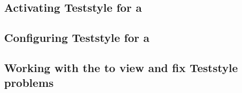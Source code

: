 \subsection{Activating Teststyle for a \gdproject{}}
\label{TeststyleActivate}


\subsection{Configuring Teststyle for a \gdproject{}}
\label{TeststyleConfigure}


\subsection{Working with the \gdprobview{} to view and fix Teststyle problems}
\label{TeststyleProbView}

